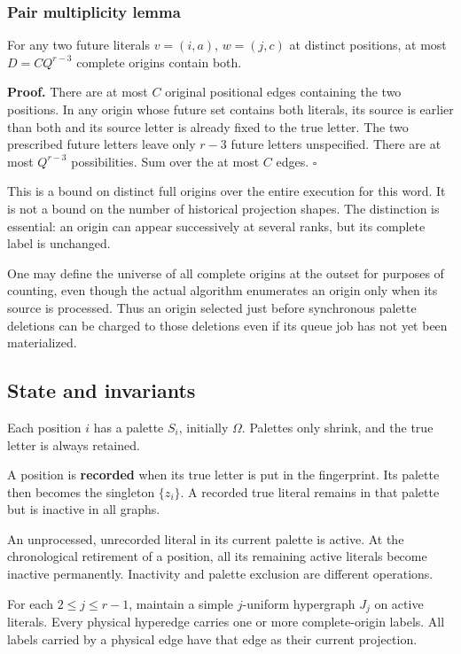 \subsubsection{Pair multiplicity lemma}\label{pair-multiplicity-lemma}

For any two future literals \(v=(i,a)\), \(w=(j,c)\) at distinct positions, at most \(D=CQ^{r-3}\) complete origins contain both.

\textbf{Proof.} There are at most \(C\) original positional edges containing the two positions. In any origin whose future set contains both literals, its source is earlier than both and its source letter is already fixed to the true letter. The two prescribed future letters leave only \(r-3\) future letters unspecified. There are at most \(Q^{r-3}\) possibilities. Sum over the at most \(C\) edges. \(\square\)

This is a bound on distinct full origins over the entire execution for this word. It is not a bound on the number of historical projection shapes. The distinction is essential: an origin can appear successively at several ranks, but its complete label is unchanged.

One may define the universe of all complete origins at the outset for purposes of counting, even though the actual algorithm enumerates an origin only when its source is processed. Thus an origin selected just before synchronous palette deletions can be charged to those deletions even if its queue job has not yet been materialized.

\subsection{State and invariants}\label{state-and-invariants}

Each position \(i\) has a palette \(S_i\), initially \(\Omega\). Palettes only shrink, and the true letter is always retained.

A position is \textbf{recorded} when its true letter is put in the fingerprint. Its palette then becomes the singleton \(\{z_i\}\). A recorded true literal remains in that palette but is inactive in all graphs.

An unprocessed, unrecorded literal in its current palette is active. At the chronological retirement of a position, all its remaining active literals become inactive permanently. Inactivity and palette exclusion are different operations.

For each \(2\le j\le r-1\), maintain a simple \(j\)-uniform hypergraph \(J_j\) on active literals. Every physical hyperedge carries one or more complete-origin labels. All labels carried by a physical edge have that edge as their current projection.

